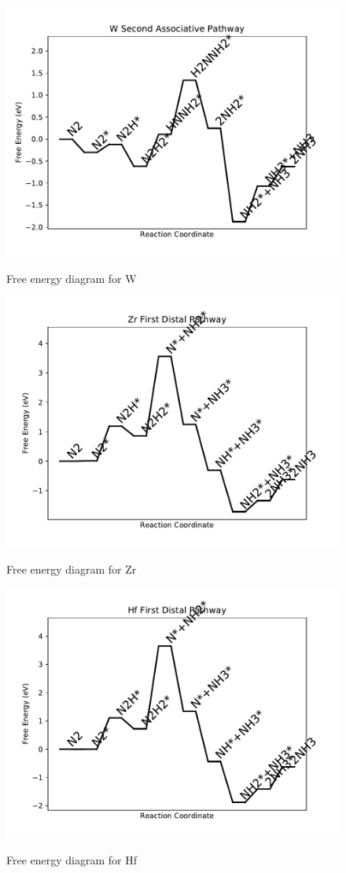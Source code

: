 \documentclass{article}
\begin{document}
\newpage
\begin{figure}
\includegraphics[width=1\linewidth]{data/plots/W_associative_2.pdf}
\label{fig:W_associative_2}
\caption{Free energy diagram for W}
\end{figure}

\begin{figure}
\includegraphics[width=1\linewidth]{data/plots/Zr_distal_1.pdf}
\label{fig:Zr_distal_1}
\caption{Free energy diagram for Zr}
\end{figure}

\newpage
\begin{figure}
\includegraphics[width=1\linewidth]{data/plots/Hf_distal_1.pdf}
\label{fig:Hf_distal_1}
\caption{Free energy diagram for Hf}
\end{figure}
\end{document}
